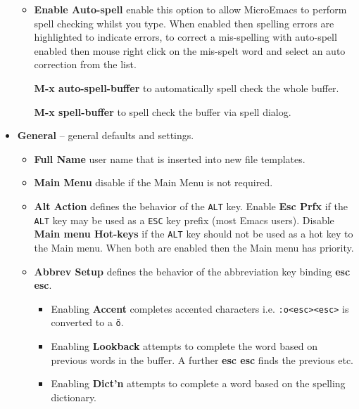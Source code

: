 \documentclass[11pt,a4paper,pdftex]{article}
\begin{document}
\begin{itemize}
\begin{itemize}
      \item \textbf{Enable Auto-spell} enable this option to allow MicroEmacs
      to perform spell checking whilst you type. When enabled then spelling
      errors are highlighted to indicate errors, to correct a mis-spelling
      with auto-spell enabled then mouse right click on the mis-spelt word and
      select an auto correction from the list.

      \textbf{M-x auto-spell-buffer} to automatically spell check the
      whole buffer.

      \textbf{M-x spell-buffer} to spell check the buffer via spell dialog.

    \end{itemize}

    \item \textbf{General} -- general defaults and settings.

    \begin{itemize}

      \item \textbf{Full Name} user name that is inserted into new file
      templates.

      \item \textbf{Main Menu} disable if the Main Menu is not required.

      \item \textbf{Alt Action} defines the behavior of the \texttt{ALT} key.
      Enable \textbf{Esc Prfx} if the \texttt{ALT} key may be used as a
      \texttt{ESC} key prefix (most Emacs users). Disable \textbf{Main menu
      Hot-keys} if the \texttt{ALT} key should not be used as a hot key to the
      Main menu. When both are enabled then the Main menu has priority.

      \item \textbf{Abbrev Setup} defines the behavior of the abbreviation key
      binding \textbf{esc esc}.

      \begin{itemize}

        \item Enabling \textbf{Accent} completes accented characters i.e.
        \texttt{:o<esc><esc>} is converted to a \texttt{\"{o}}.

        \item Enabling \textbf{Lookback} attempts to complete the word based
        on previous words in the buffer. A further \textbf{esc esc} finds the
        previous etc.

        \item Enabling \textbf{Dict'n} attempts to complete a word based on
        the spelling dictionary.


\end{itemize}
\end{itemize}
\end{itemize}
\end{document}
